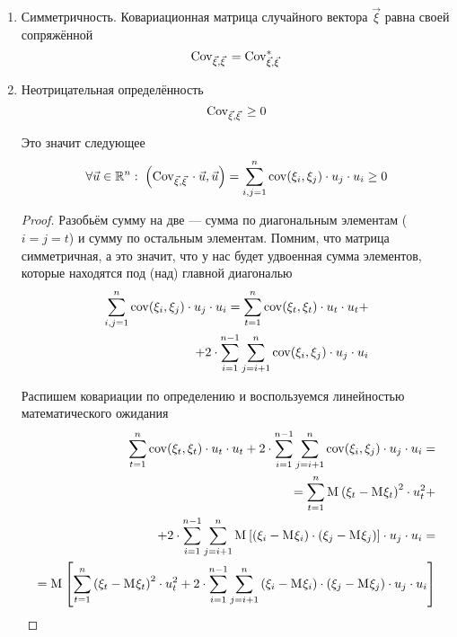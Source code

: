 \begin{enumerate}
    \item Симметричность. Ковариационная матрица случайного вектора $\vec{\xi}$
        равна своей сопряжённой
        $$\mathrm{Cov}_{\vec{\xi}, \vec{\xi}}\, = \mathrm{Cov}_{\vec{\xi}, \vec{\xi}}^*\,$$
    \item Неотрицательная определённость
        $$\mathrm{Cov}_{\vec{\xi}, \vec{\xi}}\, \ge 0$$

        Это значит следующее
        $$\forall \vec{u} \in \mathbb{R}^n:\;
            \left( \mathrm{Cov}_{\vec{\xi}, \vec{\xi}}\, \cdot \vec{u}, \vec{u} \right)
            = \sum_{i,j=1}^{n} \mathrm{cov}\!\left( \xi_i, \xi_j \right) \cdot u_j \cdot u_i
            \ge 0$$

        \begin{proof}
            Разобьём сумму на две --- сумма по диагональным элементам ($i=j=t$)
            и сумму по остальным элементам. Помним, что матрица симметричная,
            а это значит, что у нас будет удвоенная сумма элементов, которые
            находятся под (над) главной диагональю
            \begin{align*}
                \sum_{i,j=1}^{n} \mathrm{cov}\!\left( \xi_i, \xi_j \right) \cdot u_j \cdot u_i
                    = \sum_{t=1}^{n} \mathrm{cov}\!\left( \xi_t, \xi_t \right) \cdot u_t \cdot u_t + \\
                        + 2 \cdot \sum_{i=1}^{n-1} \sum_{j=i+1}^{n}
                            \mathrm{cov}\!\left( \xi_i, \xi_j \right) \cdot u_j \cdot u_i
            \end{align*}

            Распишем ковариации по определению и воспользуемся линейностью
            математического ожидания
            \begin{align*}
                \sum_{t=1}^{n} \mathrm{cov}\!\left( \xi_t, \xi_t \right) \cdot u_t \cdot u_t
                    + 2 \cdot \sum_{i=1}^{n-1} \sum_{j=i+1}^{n}
                        \mathrm{cov}\!\left( \xi_i, \xi_j \right) \cdot u_j \cdot u_i = \\
                    = \sum_{t=1}^{n}
                            \mathrm{M}_{} \left( \xi_t - \mathrm{M}_{} \xi_t \right)^2
                            \cdot u_t^2 + \\
                        + 2 \cdot \sum_{i=1}^{n-1} \sum_{j=i+1}^{n}
                            \mathrm{M}_{} \left[ \left( \xi_i - \mathrm{M}_{} \xi_i \right)
                                \cdot \left( \xi_j - \mathrm{M}_{} \xi_j \right) \right]
                            \cdot u_j \cdot u_i = \\
                    = \mathrm{M}_{} \left[ \sum_{t=1}^{n}
                            \left( \xi_t - \mathrm{M}_{} \xi_t \right)^2 \cdot u_t^2
                        + 2 \cdot \sum_{i=1}^{n-1} \sum_{j=i+1}^{n}
                            \left( \xi_i - \mathrm{M}_{} \xi_i \right)
                                \cdot \left( \xi_j - \mathrm{M}_{} \xi_j \right)
                            \cdot u_j \cdot u_i \right]
            \end{align*}


\end{proof}
\end{enumerate}
